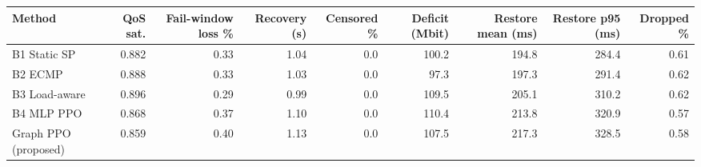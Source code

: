 \begin{tabular}{lrrrrrrrr}
\toprule
Method & QoS sat. & Fail-window loss \% & Recovery (s) & Censored \% & Deficit (Mbit) & Restore mean (ms) & Restore p95 (ms) & Dropped \% \\
\midrule
B1 Static SP & 0.882 & 0.33 & 1.04 & 0.0 & 100.2 & 194.8 & 284.4 & 0.61 \\
B2 ECMP & 0.888 & 0.33 & 1.03 & 0.0 & 97.3 & 197.3 & 291.4 & 0.62 \\
B3 Load-aware & 0.896 & 0.29 & 0.99 & 0.0 & 109.5 & 205.1 & 310.2 & 0.62 \\
B4 MLP PPO & 0.868 & 0.37 & 1.10 & 0.0 & 110.4 & 213.8 & 320.9 & 0.57 \\
Graph PPO (proposed) & 0.859 & 0.40 & 1.13 & 0.0 & 107.5 & 217.3 & 328.5 & 0.58 \\
\bottomrule
\end{tabular}